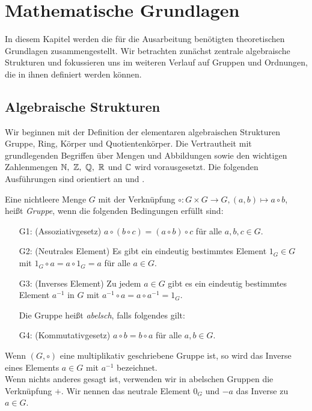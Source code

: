 \chapter{Mathematische Grundlagen}
In diesem Kapitel werden die für die Ausarbeitung benötigten theoretischen Grundlagen zusammengestellt. Wir betrachten zunächst zentrale algebraische Strukturen und fokussieren uns im weiteren Verlauf auf Gruppen und Ordnungen, die in ihnen definiert werden können.
\section{Algebraische Strukturen}
Wir beginnen mit der Definition der elementaren algebraischen Strukturen Gruppe, Ring, Körper und Quotientenkörper. Die Vertrautheit mit grundlegenden Begriffen über Mengen und Abbildungen sowie den wichtigen Zahlenmengen $\mathbb{N}, ~\mathbb{Z},~ \mathbb{Q},~ \mathbb{R}$ und $\mathbb{C}$ wird vorausgesetzt. Die folgenden Ausführungen sind orientiert an \cite{rainer08} und \cite{fischer08}.
%
\begin{defn}\label{Gruppe}
Eine nichtleere Menge $G$ mit der Verknüpfung $\circ \colon G \times G \rightarrow G, \left( a, b\right) \mapsto a \circ b$, heißt \textit{Gruppe}, wenn die folgenden Bedingungen erfüllt sind:
\begin{enumerate}
\item[G1: ] (Assoziativgesetz) $a\circ \left(b\circ c\right) = \left(a\circ b\right) \circ c$ für alle $a, b, c \in G$.
\item[G2: ] (Neutrales Element) Es gibt ein eindeutig bestimmtes Element $1_G \in G$ mit $1_G \circ a  = a \circ 1_G = a$ für alle $a \in G$.
\item[G3: ] (Inverses Element) Zu jedem $a \in G$ gibt es ein eindeutig bestimmtes Element $a^{-1}$ in $G$ mit $a^{-1} \circ a = a \circ a^{-1} = 1_G$. \\
\item[] Die Gruppe heißt \textit{abelsch}, falls folgendes gilt: 
\item[G4: ] (Kommutativgesetz) $a \circ b = b \circ a$ für alle $a, b \in G$.  
\end{enumerate} 
\end{defn}
%
%
\begin{bem}
Wenn $\left(G, \circ\right)$ eine multiplikativ geschriebene Gruppe ist, so wird das Inverse eines Elements $a\in G$ mit $a^{-1}$ bezeichnet. \\
Wenn nichts anderes gesagt ist, verwenden wir in abelschen Gruppen die Verknüpfung $+$. Wir nennen das neutrale Element $0_G$ und $-a$ das Inverse zu $a\in G$. 
\end{bem}
